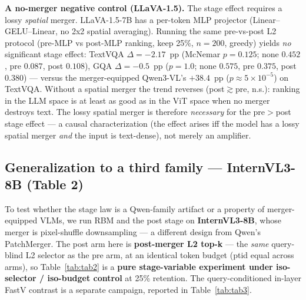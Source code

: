 \documentclass[sigconf,review,anonymous]{acmart}
\begin{document}
\textbf{A no-merger negative control (LLaVA-1.5).} The stage effect requires a
lossy \emph{spatial} merger. LLaVA-1.5-7B has a per-token MLP projector
(Linear--GELU--Linear, no 2x2 spatial averaging). Running the same pre-vs-post
L2 protocol (pre-MLP vs post-MLP ranking, keep 25\%, $n{=}200$, greedy) yields
\emph{no} significant stage effect: TextVQA $\Delta = -2.17$~pp (McNemar
$p{=}0.125$; none $0.452$, pre $0.087$, post $0.108$), GQA $\Delta = -0.5$~pp
($p{=}1.0$; none $0.575$, pre $0.375$, post $0.380$) --- versus the
merger-equipped Qwen3-VL's $+38.4$~pp ($p{\approx}5{\times}10^{-5}$) on TextVQA.
Without a spatial merger the trend reverses (post$\gtrsim$pre, n.s.): ranking in
the LLM space is at least as good as in the ViT space when no merger destroys
text. The lossy spatial merger is therefore \emph{necessary} for the pre$>$post
stage effect --- a causal characterization (the effect arises iff the model has a
lossy spatial merger \emph{and} the input is text-dense), not merely an
amplifier.

\subsection{Generalization to a third family --- InternVL3-8B (Table 2)}\label{sec:internvl}

To test whether the stage law is a Qwen-family artifact or a property of
merger-equipped VLMs, we run RBM and the post stage on \textbf{InternVL3-8B},
whose merger is pixel-shuffle downsampling --- a different design from Qwen's
PatchMerger. The post arm here is \textbf{post-merger L2 top-k} --- the
\emph{same} query-blind L2 selector as the pre arm, at an identical token budget
(ptid equal across arms), so Table~\ref{tab:tab2} is a \textbf{pure
stage-variable experiment under iso-selector / iso-budget control} at 25\%
retention. The query-conditioned in-layer FastV contrast is a separate campaign,
reported in Table~\ref{tab:tab3}.
\end{document}
